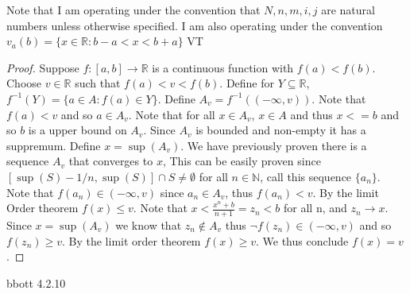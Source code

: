 \documentclass[12pt]{article}
\makeatletter
\theoremstyle{homework}
\newenvironment{exercise}[1]
{\def\@currentlabel{#1}\exercisecore}
{\endexercisecore}
\makeatother
\begin{document}
Note that I am operating under the convention that $N,n,m,i,j$ are natural numbers unless otherwise specified.  I am also operating under the convention $v_a(b)=\{x\in\mathbb{R}:b-a<x<b+a\}$
\begin{exercise}

IVT\\
\end{exercise}
\begin{proof}
Suppose $f:[a,b]\rightarrow \mathbb{R}$ is a continuous function with $f(a)<f(b)$.  Choose $v\in\mathbb{R}$ such that $f(a)<v<f(b)$.  Define for $Y\subseteq\mathbb{R}$, $f^{-1}(Y)=\{a\in A:f(a)\in Y\}$.  Define $A_v=f^{-1}((-\infty,v))$.  Note that $f(a)<v$ and so $a\in A_v$.  Note that for all $x\in A_v$, $x\in A$ and thus $x<=b$ and so $b$ is a upper bound on $A_v$.  Since $A_v$ is bounded and non-empty it has a suppremum.  Define $x=\sup(A_v)$.  We have previously proven there is a sequence $A_v$ that converges to $x$, This can be easily proven since $[\sup(S)-1/n,\sup(S)]\cap S\neq \emptyset$ for all $n\in\mathbb{N}$, call this sequence $\{a_n\}$.  Note that $f(a_n)\in (-\infty,v)$ since $a_n\in A_v$, thus $f(a_n)<v$.  By the limit Order theorem $f(x)\leq v$.  Note that $x<\frac{x^n+b}{n+1}=z_n<b$ for all n, and $z_n\rightarrow x$.  Since $x=\sup(A_v)$ we know that $z_n\not\in A_v$ thus $\neg f(z_n)\in (-\infty,v)$ and so $f(z_n)\geq v$.  By the limit order theorem $f(x)\geq v$.  We thus conclude $f(x)=v$.
\end{proof}
\begin{exercise}

Abbott 4.2.10\\
\end{exercise}
\end{document}

